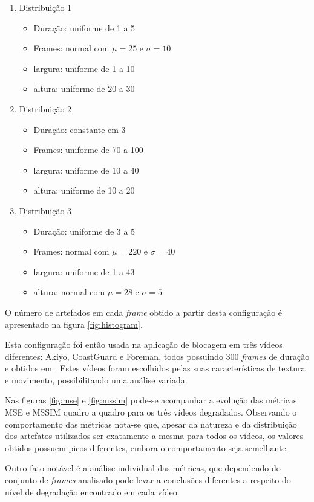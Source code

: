 \begin{enumerate}
	\item Distribuição 1
	\begin{itemize}
		\item Duração: uniforme de 1 a 5
		\item Frames: normal com \(\mu = 25\) e \(\sigma = 10\)
		\item largura: uniforme de 1 a 10
		\item altura: uniforme de 20 a 30
	\end{itemize}
	\item Distribuição 2
	\begin{itemize}
		\item Duração: constante em 3
		\item Frames: uniforme de 70 a 100
		\item largura: uniforme de 10 a 40
		\item altura: uniforme de 10 a 20
	\end{itemize}
	\item Distribuição 3
	\begin{itemize}
		\item Duração: uniforme de 3 a 5
		\item Frames: normal com \(\mu = 220\) e \(\sigma = 40\)
		\item largura: uniforme de 1 a 43
		\item altura: normal com \(\mu = 28\) e \(\sigma = 5\)
	\end{itemize}
\end{enumerate}

O número de artefados em cada \emph{frame} obtido a partir desta configuração é apresentado na figura \ref{fig:histogram}.

Esta configuração foi então usada na aplicação de blocagem em três vídeos diferentes: Akiyo, CoastGuard e Foreman, todos possuindo 300 \emph{frames} de duração e obtidos em \cite{xiph}. Estes vídeos foram escolhidos pelas suas características de textura e movimento, possibilitando uma análise variada.

Nas figuras \ref{fig:mse} e \ref{fig:mssim} pode-se acompanhar a evolução das métricas MSE e MSSIM quadro a quadro para os três vídeos degradados. Observando o comportamento das métricas nota-se que, apesar da natureza e da distribuição dos artefatos utilizados ser exatamente a mesma para todos os vídeos, os valores obtidos possuem picos diferentes, embora o comportamento seja semelhante.

Outro fato notável é a análise individual das métricas, que dependendo do conjunto de \emph{frames} analisado pode levar a conclusões diferentes a respeito do nível de degradação encontrado em cada vídeo.


